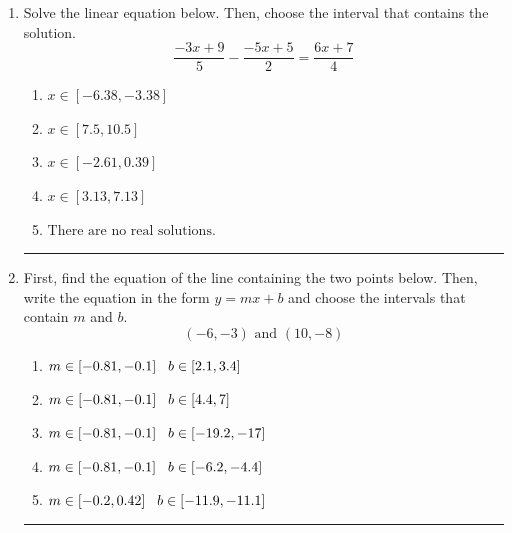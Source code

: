 \documentclass[14pt]{extbook}
\newcommand{\litem}[1]{\item#1\hspace*{-1cm}\rule{\textwidth}{0.4pt}}
\begin{document}
\begin{enumerate}
{\begin{enumerate}[label=\Alph*.]
\end{enumerate} }
\litem{
Solve the linear equation below. Then, choose the interval that contains the solution.\[ \frac{-3x + 9}{5} - \frac{-5x + 5}{2} = \frac{6x + 7}{4} \]\begin{enumerate}[label=\Alph*.]
\item \( x \in [-6.38, -3.38] \)
\item \( x \in [7.5, 10.5] \)
\item \( x \in [-2.61, 0.39] \)
\item \( x \in [3.13, 7.13] \)
\item \( \text{There are no real solutions.} \)

\end{enumerate} }
\litem{
First, find the equation of the line containing the two points below. Then, write the equation in the form $ y=mx+b $ and choose the intervals that contain $m$ and $b$.\[ (-6, -3) \text{ and } (10, -8) \]\begin{enumerate}[label=\Alph*.]
\item \( m \in [-0.81, -0.1] \hspace*{3mm} b \in [2.1, 3.4] \)
\item \( m \in [-0.81, -0.1] \hspace*{3mm} b \in [4.4, 7] \)
\item \( m \in [-0.81, -0.1] \hspace*{3mm} b \in [-19.2, -17] \)
\item \( m \in [-0.81, -0.1] \hspace*{3mm} b \in [-6.2, -4.4] \)
\item \( m \in [-0.2, 0.42] \hspace*{3mm} b \in [-11.9, -11.1] \)


\end{enumerate}}
\end{enumerate}
\end{document}
